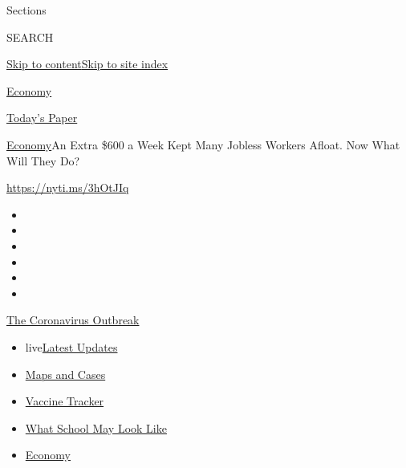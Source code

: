 Sections

SEARCH

\protect\hyperlink{site-content}{Skip to
content}\protect\hyperlink{site-index}{Skip to site index}

\href{https://www.nytimes3xbfgragh.onion/section/business/economy}{Economy}

\href{https://myaccount.nytimes3xbfgragh.onion/auth/login?response_type=cookie\&client_id=vi}{}

\href{https://www.nytimes3xbfgragh.onion/section/todayspaper}{Today's
Paper}

\href{/section/business/economy}{Economy}\textbar{}An Extra \$600 a Week
Kept Many Jobless Workers Afloat. Now What Will They Do?

\url{https://nyti.ms/3hOtJIq}

\begin{itemize}
\item
\item
\item
\item
\item
\item
\end{itemize}

\href{https://www.nytimes3xbfgragh.onion/news-event/coronavirus?action=click\&pgtype=Article\&state=default\&region=TOP_BANNER\&context=storylines_menu}{The
Coronavirus Outbreak}

\begin{itemize}
\tightlist
\item
  live\href{https://www.nytimes3xbfgragh.onion/2020/08/01/world/coronavirus-covid-19.html?action=click\&pgtype=Article\&state=default\&region=TOP_BANNER\&context=storylines_menu}{Latest
  Updates}
\item
  \href{https://www.nytimes3xbfgragh.onion/interactive/2020/us/coronavirus-us-cases.html?action=click\&pgtype=Article\&state=default\&region=TOP_BANNER\&context=storylines_menu}{Maps
  and Cases}
\item
  \href{https://www.nytimes3xbfgragh.onion/interactive/2020/science/coronavirus-vaccine-tracker.html?action=click\&pgtype=Article\&state=default\&region=TOP_BANNER\&context=storylines_menu}{Vaccine
  Tracker}
\item
  \href{https://www.nytimes3xbfgragh.onion/interactive/2020/07/29/us/schools-reopening-coronavirus.html?action=click\&pgtype=Article\&state=default\&region=TOP_BANNER\&context=storylines_menu}{What
  School May Look Like}
\item
  \href{https://www.nytimes3xbfgragh.onion/live/2020/07/31/business/stock-market-today-coronavirus?action=click\&pgtype=Article\&state=default\&region=TOP_BANNER\&context=storylines_menu}{Economy}
\end{itemize}


